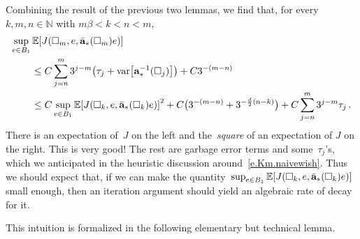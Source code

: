 \documentclass[11pt]{article} %
\let\oldsquare\square %
\renewcommand{\square}{\oldsquare}
\numberwithin{equation}{section}
\theoremstyle{definition}
\let\originalleft\left
\let\originalright\right
\renewcommand{\left}{\mathopen{}\mathclose\bgroup\originalleft}
\renewcommand{\right}{\aftergroup\egroup\originalright}
\newcommand*{\N}{\ensuremath{\mathbb{N}}}
\renewcommand{\a}{\mathbf{a}}
\newcommand{\ahom}{\bar{\a}}
\newcommand{\cu}{\square}
\newcommand{\E}{\mathbb{E}}
\DeclareMathOperator{\var}{var}
\begin{document}
Combining the result of the previous two lemmas, we find that, for every~$k,m,n\in\N$ with $m\beta < k < n< m$,
\begin{align}
\label{e.combo}
\lefteqn{
\sup_{e\in B_1}
\E \left[ J(\cu_m,e,\ahom_*(\cu_m)e) \right]
} \qquad & 
\notag \\ &
\leq 
C 
\sum_{j=n}^{m} 3^{j-m} 
\left( \tau_j + \var\left[ \a_*^{-1}(\cu_j) \right] \right)
+C 3^{-(m-n)}
\notag \\ & 
\leq 
C\sup_{e\in B_1 }
\E \left[ J(\cu_k,e,\ahom_*(\cu_k) e) \right]^2
+
C 
\bigl( 3^{-(m-n)} + 3^{-\frac d2(n-k)} \bigr)
+
C\sum_{j=n}^m 3^{j-m} \tau_j
\,.
\end{align}
There is an expectation of~$J$ on the left and the~\emph{square} of an expectation of $J$ on the right. This is very good! The rest are garbage error terms and some~$\tau_j$'s, which we anticipated in the heuristic discussion around~\eqref{e.Km.naivewish}. 
Thus we should expect that, if we can make the quantity~$\sup_{e\in B_1 }
\E \left[ J(\cu_k,e,\ahom_*(\cu_k) e) \right]$ small enough, then an iteration argument should yield an algebraic rate of decay for it. 

\smallskip

This intuition is formalized in the following elementary but technical lemma. 
\end{document}
